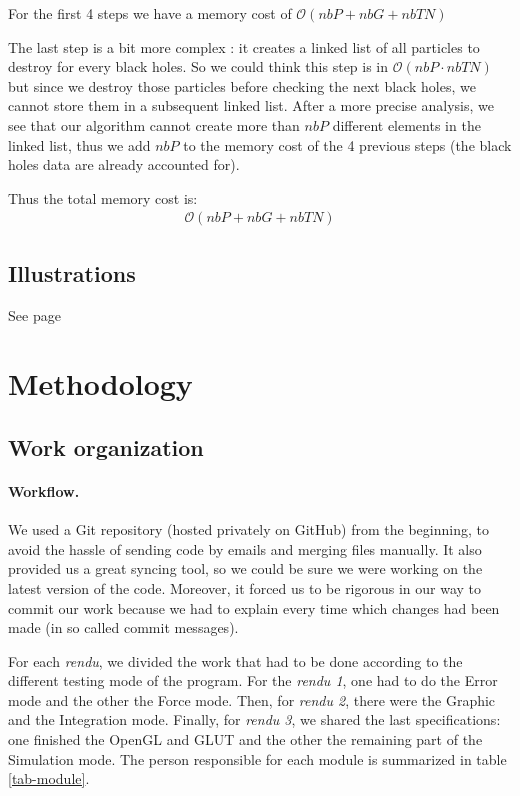 \documentclass[a4paper]{article} %
\begin{document}
\begin{multicols*}{2}
For the first 4 steps we have a memory cost of $\mathcal{O}(nbP + nbG + nbTN)$

The last step is a bit more complex :
it creates a linked list of all particles to destroy for every black holes.
So we could think this step is in $\mathcal{O}(nbP \cdot nbTN)$ but since we destroy those particles before
checking the next black holes, we cannot store them in a subsequent linked list.
After a more precise analysis, we see that our algorithm cannot create more than $nbP$ different
elements in the linked list, thus we add $nbP$ to the memory cost of the 4 previous steps
(the black holes data are already accounted for).

Thus the total memory cost is:
\begin{align}
\mathcal{O}(nbP + nbG + nbTN)
\end{align}


\subsection{Illustrations}
See page \pageref{lastpage}

\section{Methodology}
\subsection{Work organization}

\paragraph{Workflow.} We used a Git repository (hosted privately on GitHub) from the beginning,
to avoid the hassle of sending code by emails and merging files manually.
It also provided us a great syncing tool, so we could be sure we were working on
the latest version of the code.
Moreover, it forced us to be rigorous in our way to commit our work
because we had to explain every time which changes had been made
(in so called commit messages).

For each \emph{rendu}, we divided the work that had to be done
according to the different testing mode of the program.
For the \emph{rendu 1}, one had to do the Error mode and the other the Force mode.
Then, for \emph{rendu 2}, there were the Graphic and the Integration mode.
Finally, for \emph{rendu 3}, we shared the last specifications:
one finished the OpenGL and GLUT
and the other the remaining part of the Simulation mode.
The person responsible for each module is summarized in table \ref{tab-module}.


\end{multicols*}
\end{document}

